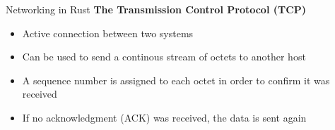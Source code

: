 \begin{frame}{Networking in Rust}
    \textbf{The Transmission Control Protocol (TCP)}
    \begin{itemize}
        \item<2-> Active connection between two systems
        \item<3-> Can be used to send a continous stream of octets to another host
        \item<4-> A sequence number is assigned to each octet in order to confirm it was received
        \item<5> If no acknowledgment (ACK) was received, the data is sent again
    \end{itemize}

\end{frame}
